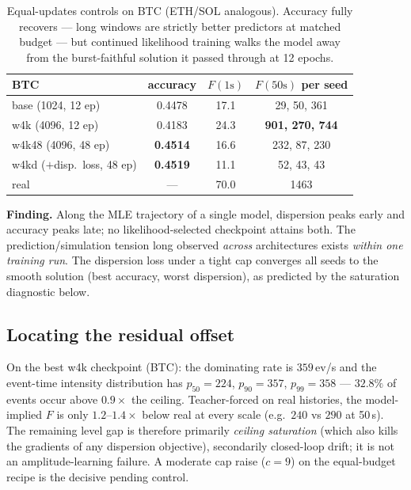 \documentclass[11pt]{article}
\newcommand{\Fano}{F}
\begin{document}
\begin{table}[h]\centering\small
\begin{tabular}{lccc}
\toprule
BTC & accuracy & $\Fano(1\mathrm{s})$ & $\Fano(50\mathrm{s})$ per seed \\
\midrule
base (1024, 12 ep) & 0.4478 & 17.1 & 29, 50, 361 \\
w4k (4096, 12 ep) & 0.4183 & 24.3 & \textbf{901, 270, 744} \\
w4k48 (4096, 48 ep) & \textbf{0.4514} & 16.6 & 232, 87, 230 \\
w4kd ($+$disp.\ loss, 48 ep) & \textbf{0.4519} & 11.1 & 52, 43, 43 \\
\midrule
real & --- & 70.0 & 1463 \\
\bottomrule
\end{tabular}
\caption{Equal-updates controls on BTC (ETH/SOL analogous). Accuracy fully
recovers --- long windows are strictly better predictors at matched budget ---
but continued likelihood training walks the model away from the
burst-faithful solution it passed through at 12 epochs.}
\label{tab:frontier}
\end{table}

\noindent\textbf{Finding.} Along the MLE trajectory of a single model,
dispersion peaks early and accuracy peaks late; no likelihood-selected
checkpoint attains both. The prediction/simulation tension long observed
\emph{across} architectures exists \emph{within one training run}. The
dispersion loss under a tight cap converges all seeds to the smooth solution
(best accuracy, worst dispersion), as predicted by the saturation diagnostic
below.

\subsection{Locating the residual offset}
On the best w4k checkpoint (BTC): the dominating rate is $359$\,ev/s and the
event-time intensity distribution has $p_{50}=224$, $p_{90}=357$,
$p_{99}=358$ --- $32.8\%$ of events occur above $0.9\times$ the ceiling.
Teacher-forced on real histories, the model-implied $\Fano$ is only
$1.2$--$1.4\times$ below real at every scale (e.g.\ $240$ vs $290$ at
50\,s). The remaining level gap is therefore primarily \emph{ceiling
saturation} (which also kills the gradients of any dispersion objective),
secondarily closed-loop drift; it is not an amplitude-learning failure. A
moderate cap raise ($c{=}9$) on the equal-budget recipe is the decisive
pending control.
\end{document}
